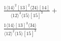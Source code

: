 \documentclass[varwidth, border=5pt]{standalone}
\begin{document}
\begin{my}
$\begin{gathered}
\scriptscriptstyle\frac{1⟨14⟩^2[13]^2⟨24⟩[14]}{⟨12⟩^3⟨15⟩[15]^3}+\\
\scriptscriptstyle\frac{1⟨14⟩[13]^3⟨34⟩}{⟨12⟩^2⟨15⟩[15]^3}\phantom{+}
\end{gathered}$
\end{my}
\end{document}
